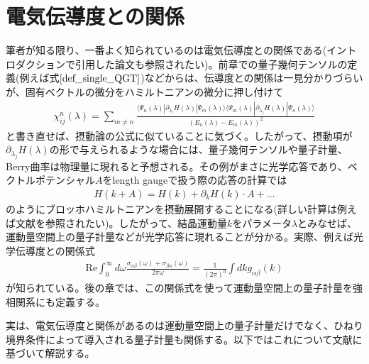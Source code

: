 \documentclass[12pt]{jsbook}
\newcommand{\la}{\langle}
\newcommand{\ra}{\rangle}
\newcommand{\pa}{\partial}
\begin{document}
\section{電気伝導度との関係}
筆者が知る限り、一番よく知られているのは電気伝導度との関係である(イントロダクションで引用した論文も参照されたい)。前章での量子幾何テンソルの定義(例えば式$\ref{def_single_QGT}$)などからは、伝導度との関係は一見分かりづらいが、固有ベクトルの微分をハミルトニアンの微分に押し付けて\cite{Resta2011}
\begin{eqnarray}
\chi^{n}_{ij}(\lambda)=\displaystyle \sum_{m\neq n}\frac{\la \Psi_n(\lambda)|\pa_{\lambda_i} H(\lambda)|\Psi_m(\lambda)\ra\la\Psi_m(\lambda)|\pa_{\lambda_j} H(\lambda)|\Psi_n(\lambda)\ra}{(E_n(\lambda)-E_m(\lambda))^2}
\end{eqnarray}
と書き直せば、摂動論の公式に似ていることに気づく。したがって、摂動項が$\pa_{\lambda_j} H(\lambda)$の形で与えられるような場合には、量子幾何テンソルや量子計量、Berry曲率は物理量に現れると予想される。その例がまさに光学応答であり、ベクトルポテンシャル$A$をlength gaugeで扱う際の応答の計算では
\begin{eqnarray}
H(k+A)=H(k) + \pa_k H(k)\cdot A + \ldots
\end{eqnarray}
のようにブロッホハミルトニアンを摂動展開することになる(詳しい計算は例えば文献\cite{michishita2021effects}を参照されたい)。したがって、結晶運動量$k$をパラメータ$\lambda$とみなせば、運動量空間上の量子計量などが光学応答に現れることが分かる。実際、例えば光学伝導度との関係式\cite{PhysRevB.62.1666}
\begin{eqnarray}
\label{relation_qmk_conductivity}
\mathrm{Re} \int_0^{\infty}d\omega \frac{\sigma_{\alpha\beta}(\omega)+\sigma_{\beta\alpha}(\omega)}{2\pi\omega}=\frac{1}{(2\pi)^d}\int dk g_{\alpha\beta}(k)
\end{eqnarray}
が知られている。後の章では、この関係式を使って運動量空間上の量子計量を強相関系にも定義する。

実は、電気伝導度と関係があるのは運動量空間上の量子計量だけでなく、ひねり境界条件によって導入される量子計量も関係する。以下ではこれについて文献\cite{PhysRevB.62.1666}に基づいて解説する。
\end{document}
